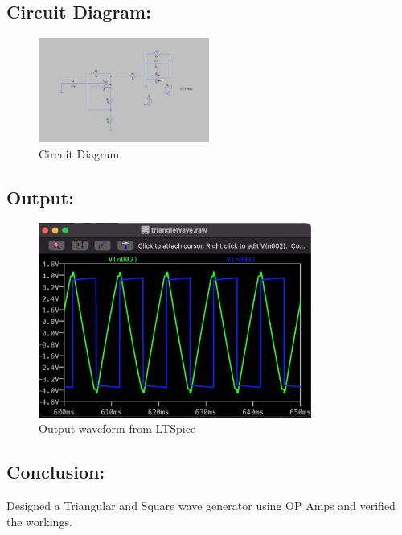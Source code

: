 \documentclass[a4paper,12pt]{report}
\begin{document}
  \vspace{0.3cm}

  \subsection{Circuit Diagram:} 
  \vspace*{1em}
  \begin{figure}[htbp]
  \centering
    \includegraphics[width=0.5\textwidth]{../Img/E3Ckt.png}
  \caption{Circuit Diagram}
  \label{fig:image}
  \end{figure}

  \vspace*{\fill} %
  \newpage

  \subsection{Output:} 
    \begin{figure}[h!]
        \centering
        \includegraphics[width=0.8\textwidth]{../Img/E3OP.png}
        \caption{Output waveform from LTSpice}
    \end{figure}

  \vspace{0.3cm}

  \subsection{Conclusion:} 
    \hspace{20pt}Designed a Triangular and Square wave generator using OP Amps and verified the workings.
\end{document}

